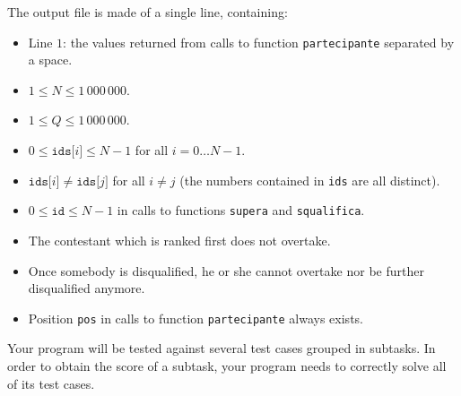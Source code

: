 The output file is made of a single line, containing:
\begin{itemize}[nolistsep,itemsep=2mm]
\item Line $1$: the values returned from calls to function \texttt{partecipante} separated by a space.
\end{itemize}



\Constraints

\begin{itemize}[nolistsep, itemsep=2mm]
	\item $1 \le N \le 1\,000\,000$.
	\item $1 \le Q \le 1\,000\,000$.
	\item $0 \le \texttt{ids[}i\texttt{]} \le N-1$ for all $i=0\ldots N-1$.
	\item $\texttt{ids[}i\texttt{]} \neq \texttt{ids[}j\texttt{]}$ for all $i \neq j$ (the numbers contained in \texttt{ids} are all distinct).
	\item $0 \le \texttt{id} \le N-1$ in calls to functions \texttt{supera} and \texttt{squalifica}.
	\item The contestant which is ranked first does not overtake.
	\item Once somebody is disqualified, he or she cannot overtake nor be further disqualified anymore.
	\item Position \texttt{pos} in calls to function \texttt{partecipante} always exists.
\end{itemize}


\pagebreak


\Scoring

Your program will be tested against several test cases grouped in subtasks.
In order to obtain the score of a subtask, your program needs to correctly solve all of its test cases.

